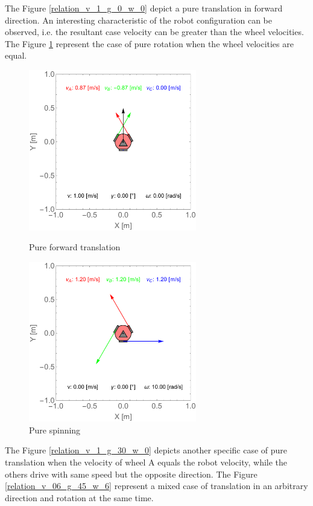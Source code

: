 \documentclass[12pt,english]{article}
\begin{document}
The Figure \ref{relation_v_1_g_0_w_0} depict a pure translation in forward direction. An interesting characteristic of the robot configuration can be observed, i.e. the resultant case velocity can be greater than the wheel velocities. The Figure \ref{relation_v_0_g_0_w_10} represent the case of pure rotation when the wheel velocities are equal.
\begin{figure}[htb!]
	\centering
	\centering
	\includegraphics[height=7cm]{figures/2d_simulation/relation_v_1_g_0_w_0}
	\caption{Pure forward translation}
	\label{relation_v_1_g_0_w_0}
	\endminipage\hfill
	\centering
	\includegraphics[height=7cm]{figures/2d_simulation/relation_v_0_g_0_w_10}
	\caption{Pure spinning}
	\label{relation_v_0_g_0_w_10}
	\endminipage\hfill
\end{figure}
The Figure \ref{relation_v_1_g_30_w_0} depicts another specific case of pure translation when the velocity of wheel A equals the robot velocity, while the others drive with same speed but the opposite direction. The Figure \ref{relation_v_06_g_45_w_6} represent a mixed case of translation in an arbitrary direction and rotation at the same time.
\end{document}
